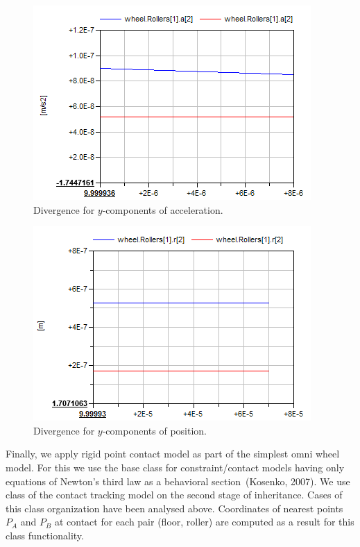 \documentclass{jsme-tj}
\begin{document}
\begin{figure}[h]
\centerline{\includegraphics[bb= 0 0 19.50cm 14cm,scale=0.45]{AccDiv.png}}
\caption{Divergence for $y$-components of acceleration.}
\label{figure6}
\end{figure}

\begin{figure}[h]
\centerline{\includegraphics[bb= 0 0 19.50cm 14cm,scale=0.45]{PosDiv.png}}
\caption{Divergence for $y$-components of position.}
\label{figure7}
\end{figure}

Finally, we apply rigid point contact model as part of the simplest omni wheel
model. For this we use the base class for constraint/contact models having only
equations of Newton's third law as a behavioral section~(Kosenko, 2007). We use 
class of the contact tracking model on the second stage of inheritance. Cases 
of this class organization have been analysed above. Coordinates of nearest 
points $P_A$ and $P_B$ at contact for each pair (floor, roller) are computed as 
a result for this class functionality.
\end{document}
